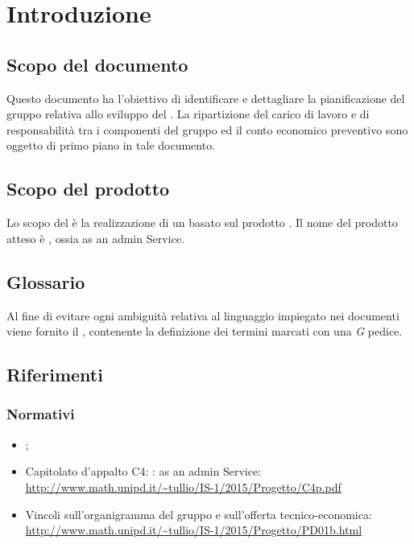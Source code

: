 \section{Introduzione}
\subsection{Scopo del documento}
Questo documento ha l’obiettivo di identificare e dettagliare la pianificazione del gruppo
relativa allo sviluppo del . La ripartizione del carico di lavoro e di responsabilit\`a tra i
componenti del gruppo ed il conto economico preventivo sono oggetto di primo piano in tale documento.

\subsection{Scopo del prodotto}
Lo scopo del  \`e la realizzazione di un  basato sul prodotto . Il nome del prodotto atteso \`e , ossia  as an admin Service.

\subsection{Glossario}
Al fine di evitare ogni ambiguit\`a relativa al linguaggio impiegato nei documenti viene fornito il \Glossario, contenente la definizione dei termini marcati con una \textit{G} pedice.

\subsection{Riferimenti}
\subsubsection{Normativi}
\begin{itemize}
\item \NormeDiProgetto;

\item Capitolato d'appalto C4: :  as an admin Service: \\ 
\url{http://www.math.unipd.it/~tullio/IS-1/2015/Progetto/C4p.pdf}

\item Vincoli sull’organigramma del gruppo e sull’offerta tecnico-economica: \\
\url{http://www.math.unipd.it/~tullio/IS-1/2015/Progetto/PD01b.html}

\end{itemize}
